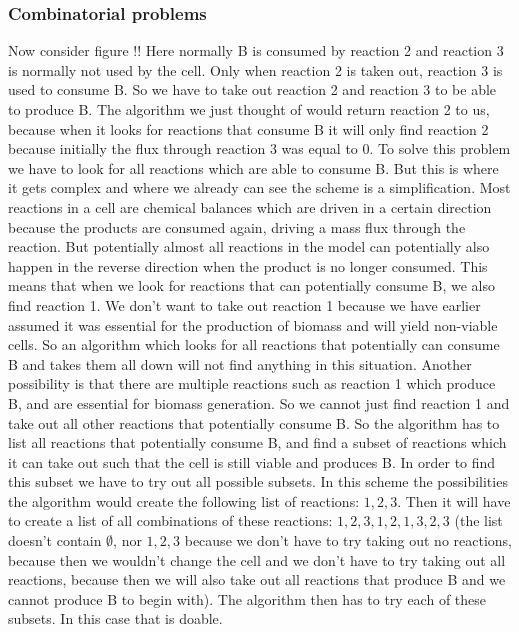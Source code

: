 \documentclass[10pt]{report}
\begin{document}
\subsubsection{Combinatorial problems}
Now consider figure !! Here normally B is consumed by reaction 2 and reaction 3 is normally not used by the cell.
Only when reaction 2 is taken out, reaction 3 is used to consume B.
So we have to take out reaction 2 and reaction 3 to be able to produce B.
The algorithm we just thought of would return reaction 2 to us, because when it looks for reactions that consume B it will only find reaction 2 because initially the flux through reaction 3 was equal to 0.
To solve this problem we have to look for all reactions which are able to consume B.
But this is where it gets complex and where we already can see the scheme is a simplification.
Most reactions in a cell are chemical balances which are driven in a certain direction because the products are consumed again, driving a mass flux through the reaction.
But potentially almost all reactions in the model can potentially also happen in the reverse direction when the product is no longer consumed.
This means that when we look for reactions that can potentially consume B, we also find reaction 1.
We don't want to take out reaction 1 because we have earlier assumed it was essential for the production of biomass and will yield non-viable cells.
So an algorithm which looks for all reactions that potentially can consume B and takes them all down will not find anything in this situation.
Another possibility is that there are multiple reactions such as reaction 1 which produce B, and are essential for biomass generation.
So we cannot just find reaction 1 and take out all other reactions that potentially consume B.
So the algorithm has to list all reactions that potentially consume B, and find a subset of reactions which it can take out such that the cell is still viable and produces B.
In order to find this subset we have to try out all possible subsets. In this scheme the possibilities the algorithm would create the following list of reactions: ${1, 2, 3}$.
Then it will have to create a list of all combinations of these reactions: ${{1},{2},{3},{1,2},{1,3},{2,3}}$ (the list doesn't contain $\emptyset$, nor ${1,2,3}$ because we don't have to try taking out no reactions, because then we wouldn't change the cell and we don't have to try taking out all reactions, because then we will also take out all reactions that produce B and we cannot produce B to begin with).
The algorithm then has to try each of these subsets.
In this case that is doable.
\end{document}
